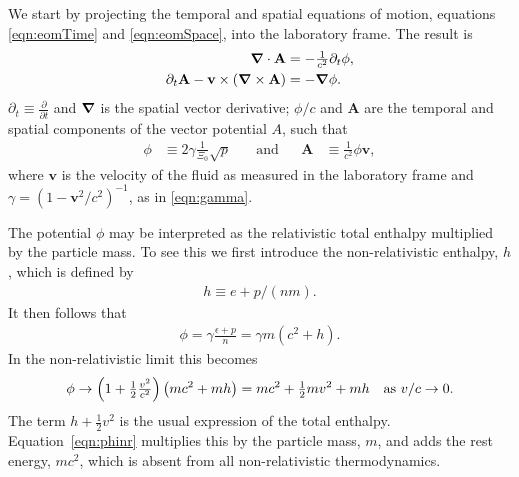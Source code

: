 \documentclass[10pt, fleqn,final,showtrims,oldfontcommands, article,a4paper,oneside]{memoir} %
\newcommand{\sub}[1]{\begin{subequations}#1\end{subequations}}
\newcommand{\eqnref}[1]{\ref{eqn:#1}}
\newcommand{\scalefactor}{\Xi_0}
\newcommand{\lr}[1]{\left( #1 \right)}
\renewcommand{\d}{\partial}
\newcommand{\del}{\nabla}
\newcommand{\vdel}{ \mbox{\boldmath $\del$}}
\newcommand{\dt}{{\d_t}}
\newcommand{\half}{\tfrac{1}{2}}
\newcommand{\g}{\gamma_0}
\newcommand{\vA}{\textbf{A}}
\newcommand{\vv}{\textbf{v}}
\begin{document}
We start  by projecting the temporal and spatial equations of motion, equations \eqnref{eomTime} and \eqnref{eomSpace},
into the laboratory frame.
The result is
\sub{
  \begin{align}
     \vdel \cdot \vA &=  - \tfrac{1}{c^2}\dt \phi, \label{eqn:Rcontinuity}\\ %
\dt \vA -  \vv \times  \lr{\vdel \times \vA} \label{eqn:REuler}
&= - \vdel \phi.
  \end{align}
}
$\dt \equiv \frac{\partial }{\partial t}$ and $\vdel$ is the spatial vector derivative;
$\phi / c$ and $\vA$ are the temporal and spatial components of the vector potential $A$, such that
\begin{align}
\phi &\equiv  2\gamma \tfrac{1}{\scalefactor }\sqrt {p}   %
& \quad\text{and} &&
\vA &\equiv \tfrac{1}{c^2} \phi \vv,  %
 \end{align}
where $\vv$ is the velocity  of the fluid as measured in the laboratory frame and 
 $\gamma = (1-\vv^2/c^2)^{-1}$, as in \eqnref{gamma}.

The potential $\phi$ may be  interpreted as the relativistic  total enthalpy multiplied by the particle mass.
To see this we first introduce the non-relativistic enthalpy, $h$, which is defined by
\begin{align}
  h \equiv e + p/(nm).
\end{align}
It then follows that 
\begin{align}
  \phi  =   \gamma\frac{\epsilon + p }{n} = \gamma m\lr{c^2 + h}.
\end{align}
In the  non-relativistic limit this becomes
\begin{align}
  \phi \rightarrow \lr{1+\tfrac{1}{2}\tfrac{v^2}{c^2}} \lr{mc^2 + mh} = mc^2 + \tfrac{1}{2}m v^2 + mh \text{\quad as ${v/c\rightarrow 0.}$}
  \label{eqn:phinr}
\end{align}
The term $h + \half v^2$ is the usual expression of the total enthalpy.
Equation~\ref{eqn:phinr} multiplies this by the particle mass, $m$, and adds the rest energy, $mc^2$, 
which is absent from all non-relativistic thermodynamics.



\end{document}
